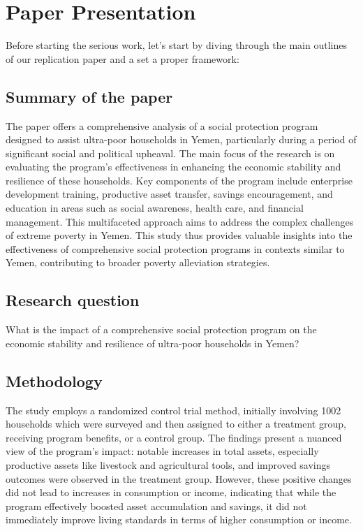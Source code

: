 \documentclass{article}
\begin{document}
\newpage

\section{Paper Presentation}

\hspace{0.3cm} Before starting the serious work, let’s start by diving through the main outlines of our replication paper and a set a proper framework:  


\subsection{Summary of the paper}  
The paper offers a comprehensive analysis of a social protection program designed to assist ultra-poor households in Yemen, particularly during a period of significant social and political upheaval. The main focus of the research is on evaluating the program's effectiveness in enhancing the economic stability and resilience of these households.
Key components of the program include enterprise development training, productive asset transfer, savings encouragement, and education in areas such as social awareness, health care, and financial management. This multifaceted approach aims to address the complex challenges of extreme poverty in Yemen.
This study thus provides valuable insights into the effectiveness of comprehensive social protection programs in contexts similar to Yemen, contributing to broader poverty alleviation strategies.

\subsection{Research question} 

What is the impact of a comprehensive social protection program on the economic stability and resilience of ultra-poor households in Yemen?

\subsection{Methodology} 

The study employs a randomized control trial method, initially involving 1002 households which were surveyed and then assigned to either a treatment group, receiving program benefits, or a control group. The findings present a nuanced view of the program's impact: notable increases in total assets, especially productive assets like livestock and agricultural tools, and improved savings outcomes were observed in the treatment group. However, these positive changes did not lead to increases in consumption or income, indicating that while the program effectively boosted asset accumulation and savings, it did not immediately improve living standards in terms of higher consumption or income.
\end{document}
